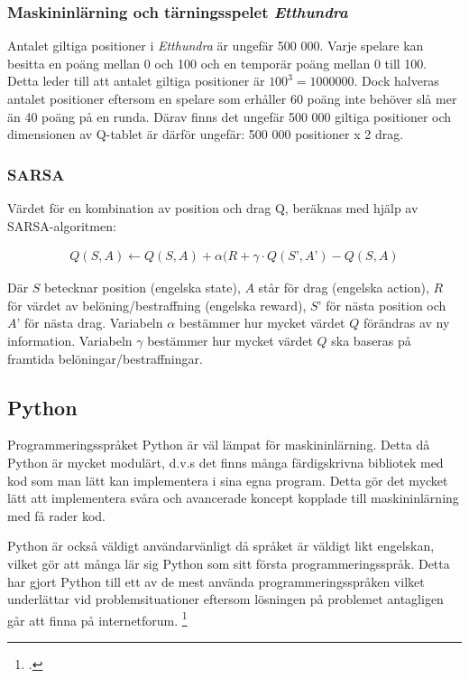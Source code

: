 \documentclass[12pt,a4paper]{article}
\begin{document}
      \subsubsection{Maskininlärning och tärningsspelet \emph{Etthundra}}\label{subsubsec:maskininlarningochtarningsspeletetthundra} 
        Antalet giltiga positioner i \emph{Etthundra} är ungefär 500 000. Varje spelare kan besitta en poäng mellan 0 och 100 och en temporär poäng mellan 0 till 100. Detta leder till att antalet giltiga positioner är $100^3 = 1 000 000$. Dock halveras antalet positioner eftersom en spelare som erhåller 60 poäng inte behöver slå mer än 40 poäng på en runda. Därav finns det ungefär 500 000 giltiga positioner och dimensionen av Q-tablet är därför ungefär: 500 000 positioner x 2 drag.

      \subsubsection{SARSA}\label{subsubsec:sarsa} 
        Värdet för en kombination av position och drag Q, beräknas med hjälp av SARSA-algoritmen:

        \begin{eqnarray}\label{eqn:sarsa} 
          Q(S, A) \leftarrow Q(S, A) + \alpha(R + \gamma \cdot Q(S’, A’) - Q(S, A) 
        \end{eqnarray}

        Där $S$ betecknar position (engelska state), $A$ står för drag (engelska action), $R$ för värdet av belöning/bestraffning (engelska reward), $S’$ för nästa position och $A’$ för nästa drag. Variabeln $\alpha$ bestämmer hur mycket värdet $Q$ förändras av ny information. Variabeln $\gamma$ bestämmer hur mycket värdet $Q$ ska baseras på framtida belöningar/bestraffningar.

    \subsection{Python}\label{subsec:python} 
      Programmeringsspråket Python är väl lämpat för maskininlärning. Detta då Python är mycket modulärt, d.v.s det finns många färdigskrivna bibliotek med kod som man lätt kan implementera i sina egna program. Detta gör det mycket lätt att implementera svåra och avancerade koncept kopplade till maskininlärning med få rader kod. 
      
      Python är också väldigt användarvänligt då språket är väldigt likt engelskan, vilket gör att många lär sig Python som sitt första programmeringsspråk. Detta har gjort Python till ett av de mest använda programmeringsspråken vilket underlättar vid problemsituationer eftersom lösningen på problemet antagligen går att finna på internetforum. \footcite{ref:stackoverflow}
\end{document}
